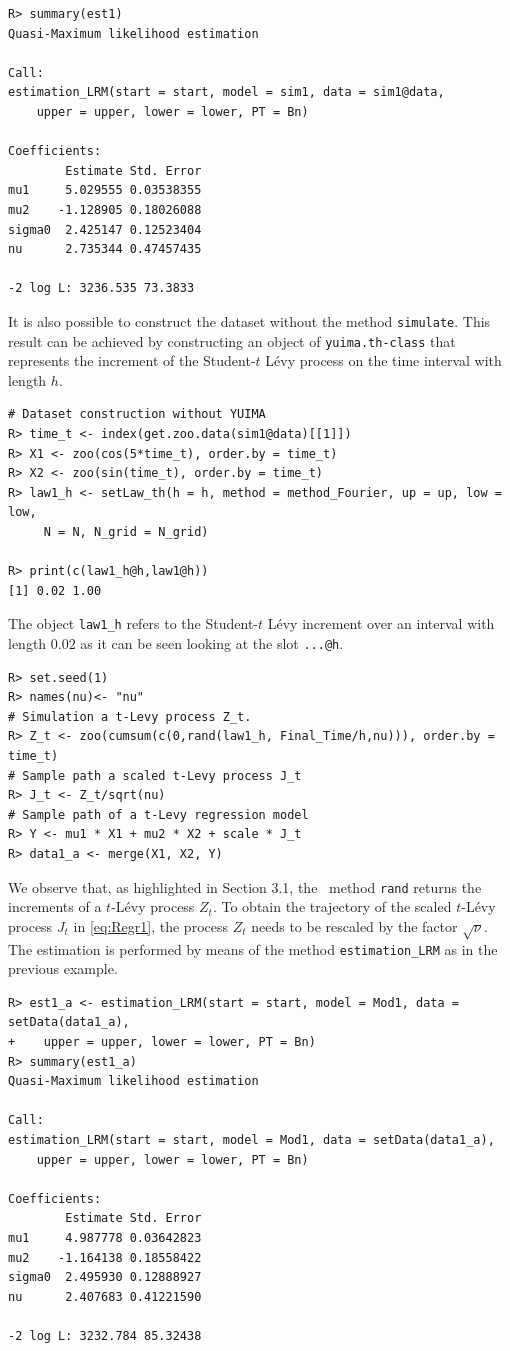 \begin{verbatim}
R> summary(est1)
Quasi-Maximum likelihood estimation

Call:
estimation_LRM(start = start, model = sim1, data = sim1@data,
    upper = upper, lower = lower, PT = Bn)

Coefficients:
        Estimate Std. Error
mu1     5.029555 0.03538355
mu2    -1.128905 0.18026088
sigma0  2.425147 0.12523404
nu      2.735344 0.47457435

-2 log L: 3236.535 73.3833
\end{verbatim}

It is also possible to construct the dataset without the method \texttt{simulate}. This result can be achieved by constructing an object of \texttt{yuima.th-class} that represents the increment of the Student-\(t\) Lévy process on the time interval with length \(h\).

\begin{verbatim}
# Dataset construction without YUIMA
R> time_t <- index(get.zoo.data(sim1@data)[[1]])
R> X1 <- zoo(cos(5*time_t), order.by = time_t)
R> X2 <- zoo(sin(time_t), order.by = time_t)
R> law1_h <- setLaw_th(h = h, method = method_Fourier, up = up, low = low,
     N = N, N_grid = N_grid)

R> print(c(law1_h@h,law1@h))
[1] 0.02 1.00
\end{verbatim}

The object \texttt{law1\_h} refers to the Student-\(t\) Lévy increment over an interval with length \(0.02\) as it can be seen looking at the slot \texttt{...@h}.

\begin{verbatim}
R> set.seed(1)
R> names(nu)<- "nu"
# Simulation a t-Levy process Z_t.
R> Z_t <- zoo(cumsum(c(0,rand(law1_h, Final_Time/h,nu))), order.by = time_t)
# Sample path a scaled t-Levy process J_t
R> J_t <- Z_t/sqrt(nu)
# Sample path of a t-Levy regression model
R> Y <- mu1 * X1 + mu2 * X2 + scale * J_t
R> data1_a <- merge(X1, X2, Y)
\end{verbatim}

We observe that, as highlighted in Section 3.1, the ~method \texttt{rand} returns the increments of a \(t\)-Lévy process \(Z_t\). To obtain the trajectory of the scaled \(t\)-Lévy process \(J_t\) in \eqref{eq:Regr1}, the process \(Z_t\) needs to be rescaled by the factor \(\sqrt{\nu}\).
The estimation is performed by means of the method \texttt{estimation\_LRM} as in the previous example.

\begin{verbatim}
R> est1_a <- estimation_LRM(start = start, model = Mod1, data = setData(data1_a),
+    upper = upper, lower = lower, PT = Bn)
R> summary(est1_a)
Quasi-Maximum likelihood estimation

Call:
estimation_LRM(start = start, model = Mod1, data = setData(data1_a),
    upper = upper, lower = lower, PT = Bn)

Coefficients:
        Estimate Std. Error
mu1     4.987778 0.03642823
mu2    -1.164138 0.18558422
sigma0  2.495930 0.12888927
nu      2.407683 0.41221590

-2 log L: 3232.784 85.32438
\end{verbatim}

